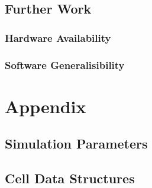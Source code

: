 \documentclass{UoYCSproject}
\begin{document}
\section{Further Work}
\subsection{Hardware Availability}

\subsection{Software Generalisibility}%


\printbibliography

\chapter{Appendix}
\section{Simulation Parameters}


\section{Cell Data Structures}
 
\end{document}
